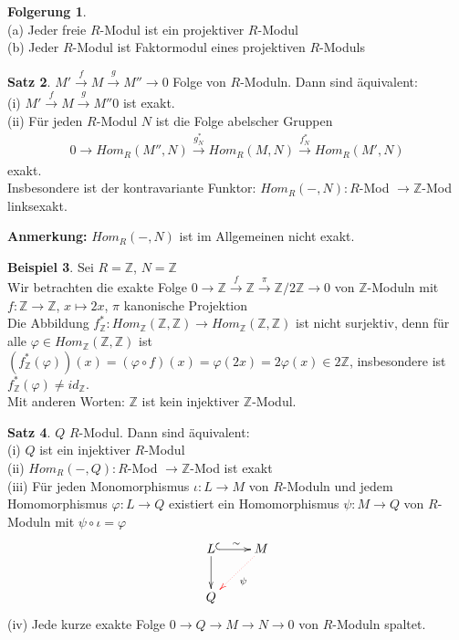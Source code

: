 \documentclass[10pt,a4paper,numbers=endperiod]{scrreprt}
\theoremstyle{definition}
\newtheorem{satz}{Satz}[section]
\newtheorem{bsp}[satz]{Beispiel}
\newtheorem{folg}[satz]{Folgerung}
\def\ZZ{{\mathbb Z}}
\begin{document}
\begin{folg}
	$ $\\
	(a) Jeder freie $R$-Modul ist ein projektiver $R$-Modul\\
	(b) Jeder $R$-Modul ist Faktormodul eines projektiven $R$-Moduls
\end{folg}

\begin{satz}
	$M' \overset{f}{\to} M \overset{g}{\to} M'' \to 0$ Folge von $R$-Moduln. Dann sind äquivalent:\\
	(i) $M' \overset{f}{\to} M \overset{g}{\to} M'' 0$ ist exakt.\\
	(ii) Für jeden $R$-Modul $N$ ist die Folge abelscher Gruppen \begin{align*}
		0 \to Hom_R(M'', N) \overset{g_N^*}{\to} Hom_R(M, N) \overset{f_N^*}{\to} Hom_R(M', N)
	\end{align*}
	exakt.\\
	Insbesondere ist der kontravariante Funktor: $Hom_R(-, N) : R$-Mod $\to \ZZ$-Mod linksexakt.
\end{satz}

\textbf{Anmerkung:} $Hom_R(-,N)$ ist im Allgemeinen nicht exakt.

\begin{bsp}
	Sei $R = \ZZ$, $N = \ZZ$\\
	Wir betrachten die exakte Folge $0 \to \ZZ \overset{f}{\to} \ZZ \overset{\pi}{\to} \ZZ/2\ZZ \to 0$ von $\ZZ$-Moduln mit $f: \ZZ \to \ZZ$, $x \mapsto 2x$, $\pi$ kanonische Projektion\\
	Die Abbildung $f_\ZZ^*: Hom_\ZZ (\ZZ, \ZZ) \to Hom_\ZZ (\ZZ, \ZZ)$ ist nicht surjektiv, denn für alle $\varphi \in Hom_\ZZ (\ZZ, \ZZ)$ ist $(f^*_\ZZ (\varphi)) (x) = (\varphi \circ f)(x) = \varphi(2x) = 2 \varphi (x) \in 2 \ZZ$, insbesondere ist $f_\ZZ^* (\varphi) \neq id_\ZZ$.\\
	Mit anderen Worten: $\ZZ$ ist kein injektiver $\ZZ$-Modul.
\end{bsp}

\begin{satz}
	$Q$ $R$-Modul. Dann sind äquivalent:\\
	(i) $Q$ ist ein injektiver $R$-Modul\\
	(ii) $Hom_R(-,Q): R$-Mod $\to \ZZ$-Mod ist exakt\\
	(iii) Für jeden Monomorphismus $\iota: L \to M$ von $R$-Moduln und jedem Homomorphismus $\varphi: L \to Q$ existiert ein Homomorphismus $\psi: M \to Q$ von $R$-Moduln mit $\psi \circ \iota = \varphi$ \begin{align*}
		\xymatrix{ L \ar[d] \ar@{^{(}->}[r]^\sim & M \ar@[red]@{.>}[dl]^\psi\\
			Q &
		}
	\end{align*} 
	(iv) Jede kurze exakte Folge $0 \to Q \to M \to N \to 0$ von $R$-Moduln spaltet.
\end{satz}
\end{document}
